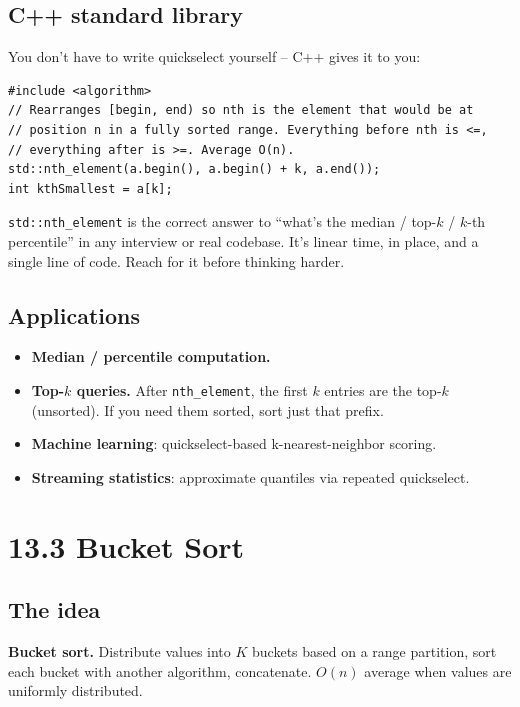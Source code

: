 \documentclass[11pt]{article}
\begin{document}
\subsection*{C++ standard library}

You don't have to write quickselect yourself -- C++ gives it to you:

\begin{lstlisting}[basicstyle=\ttfamily\small,frame=single]
#include <algorithm>
// Rearranges [begin, end) so nth is the element that would be at
// position n in a fully sorted range. Everything before nth is <=,
// everything after is >=. Average O(n).
std::nth_element(a.begin(), a.begin() + k, a.end());
int kthSmallest = a[k];
\end{lstlisting}

\begin{ideabox}
\texttt{std::nth\_element} is the correct answer to ``what's the median / top-$k$ / $k$-th percentile'' in any interview or real codebase. It's linear time, in place, and a single line of code. Reach for it before thinking harder.
\end{ideabox}

\subsection*{Applications}

\begin{itemize}[leftmargin=*]
    \item \textbf{Median / percentile computation.}
    \item \textbf{Top-$k$ queries.} After \texttt{nth\_element}, the first $k$ entries are the top-$k$ (unsorted). If you need them sorted, sort just that prefix.
    \item \textbf{Machine learning}: quickselect-based k-nearest-neighbor scoring.
    \item \textbf{Streaming statistics}: approximate quantiles via repeated quickselect.
\end{itemize}

\section{13.3 Bucket Sort}

\subsection*{The idea}

\begin{defnbox}
\textbf{Bucket sort.} Distribute values into $K$ buckets based on a range partition, sort each bucket with another algorithm, concatenate. $O(n)$ average when values are uniformly distributed.
\end{defnbox}
\end{document}
